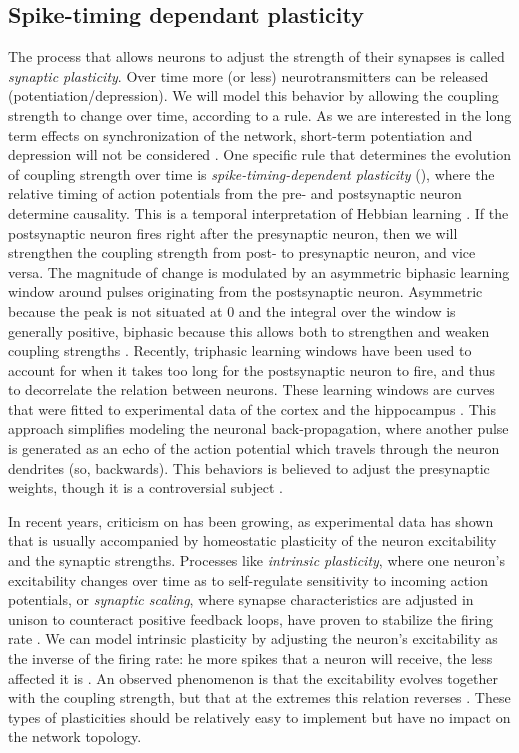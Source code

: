 \subsection{Spike-timing dependant plasticity}
The process that allows neurons to adjust the strength of their synapses is called \textsl{synaptic plasticity}. Over time more (or less) neurotransmitters can be released (potentiation/depression). We will model this behavior by allowing the coupling strength to change over time, according to a rule. As we are interested in the long term effects on synchronization of the network, short-term potentiation and depression will not be considered \cite{MathFoundationNeuroscience}.
One specific rule that determines the evolution of coupling strength over time is \textsl{spike-timing-dependent plasticity} (\STDP), where the relative timing of action potentials from the pre- and postsynaptic neuron determine causality. This is a temporal interpretation of Hebbian learning \cite{Kempter1999, Gerstner2002}. 
If the postsynaptic neuron fires right after the presynaptic neuron, then we will strengthen the coupling strength from post- to presynaptic neuron, and vice versa. The magnitude of change is modulated by an asymmetric biphasic learning window around pulses originating from the postsynaptic neuron. Asymmetric because the peak is not situated at 0 and the integral over the window is generally positive, biphasic because this allows both to strengthen and weaken coupling strengths \cite{Gerstner2002}. Recently, triphasic learning windows have been used to account for when it takes too long for the postsynaptic neuron to fire, and thus to decorrelate the relation between neurons. These learning windows are curves that were fitted to experimental data of the cortex and the hippocampus \cite{ChrolCannon2014}.
This approach simplifies modeling the neuronal back-propagation, where another pulse is generated as an echo of the action potential which travels through the neuron dendrites (so, backwards). This behaviors is believed to adjust the presynaptic weights, though it is a controversial subject \cite{Gerstner2002}.

 In recent years, criticism on \STDP has been growing, as experimental data has shown that \STDP is usually accompanied by homeostatic plasticity of the neuron excitability and the synaptic strengths. Processes like \textsl{intrinsic plasticity}, where one neuron's excitability changes over time as to self-regulate sensitivity to incoming action potentials, or \textsl{synaptic scaling}, where synapse characteristics are adjusted in unison to counteract positive feedback loops, have proven to stabilize the firing rate \cite{ChrolCannon2014, Kirkwood2019}. We can model intrinsic plasticity by adjusting the neuron's excitability as the inverse of the firing rate: he more spikes that a neuron will receive, the less affected it is \cite{LiXueSong2017}. An observed phenomenon is that the excitability evolves together with the coupling strength, but that at the extremes this relation reverses \cite{Debanne2017, Debanne2018}.  These types of plasticities should be relatively easy to implement but have no impact on the network topology.


